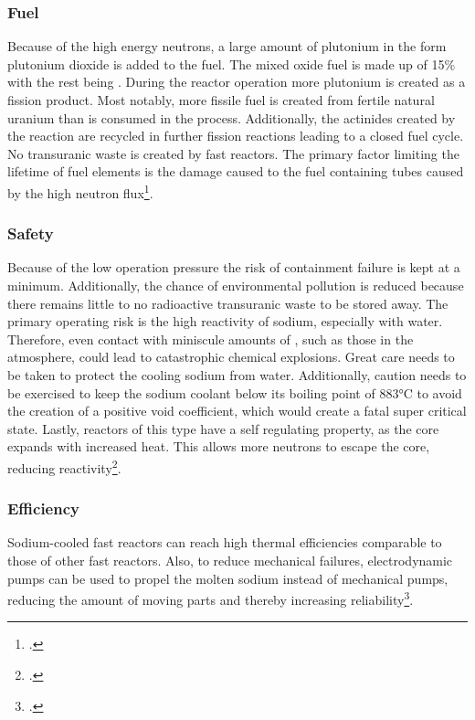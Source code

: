 \subsubsection{Fuel}
Because of the high energy neutrons, a large amount of plutonium in the form
plutonium dioxide  is added to the fuel. The mixed oxide fuel is made up of 15\% 
with the rest being . During the reactor operation more plutonium is created as a fission product.
Most notably, more fissile fuel is created from fertile natural uranium than is consumed in the process.
Additionally, the actinides created by the reaction are recycled in further fission reactions leading
to a closed fuel cycle. No transuranic waste is created by fast reactors. The primary
factor limiting the lifetime of fuel elements is the damage caused to the fuel containing tubes
caused by the high neutron flux\footcite[111]{T4Gen}.
\subsubsection{Safety}
Because of the low operation pressure the risk of containment failure is kept at a minimum. Additionally,
the chance of environmental pollution is reduced because there remains little to no radioactive transuranic
waste to be stored away. The primary operating risk is the high reactivity of sodium, especially with water.
Therefore, even contact with miniscule amounts of , such as those in the atmosphere, could
lead to catastrophic chemical explosions. Great care needs to be taken to protect the cooling
sodium from water. Additionally, caution needs to be exercised to keep the sodium coolant
below its boiling point of 883°C to avoid the creation of a positive void coefficient, which
would create a fatal super critical state. Lastly, reactors of this type have a self regulating
property, as the core expands with increased heat. This allows more neutrons to escape the
core, reducing reactivity\footcite[30-37]{GIFAR}.
\subsubsection{Efficiency}
Sodium-cooled fast reactors can reach high thermal efficiencies comparable to those of other fast
reactors. Also, to reduce mechanical failures, electrodynamic pumps can be used to propel the
molten sodium instead of mechanical pumps, reducing the amount of moving parts and thereby increasing
reliability\footcite[30-37]{GIFAR}. 
\pagebreak
